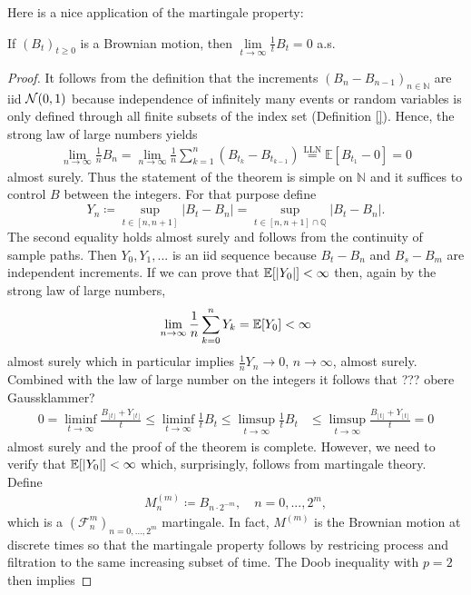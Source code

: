 Here is a nice application of the martingale property:
\begin{llemma}
\begin{prop}
	If $(B_t)_{t\geq 0}$ is a Brownian motion, then $\lim\limits_{t\to\infty} \frac{1}{t}B_t = 0$ a.s.
\end{prop}
\end{llemma}
\begin{proof}[Proof]
	It follows from the definition that the increments
	$(B_n-B_{n-1})_{n\in\mathbb{N}}$ are iid $\mathcal{N}(0,1)$ because independence of infinitely many events or random variables is only defined through all finite subsets of the index set (Definition \ref{}). Hence, the strong law of large numbers yields
	\begin{align*}
		\lim_{n\to\infty} \frac{1}{n} B_n = \lim_{n\to\infty} \frac{1}{n}\sum_{k=1}^n (B_{t_k}-B_{t_{k-1}})  \overset{\text{LLN}}{=} \mathds E[B_{t_1}-0] = 0
	\end{align*}
	almost surely. Thus the statement of the theorem is simple on $\mathbb{N}$ and it suffices to control $B$ between the integers. For that purpose define $$Y_n \coloneqq \sup_{t\in[n,n+1]} \lvert B_t - B_n \rvert = \sup_{t\in[n,n+1]\cap \mathbb{Q}} \lvert B_t - B_n \rvert.$$ The second equality holds almost surely and follows from the continuity of sample paths.
	Then $Y_0,Y_1,...$ is an iid sequence because $B_t- B_n$ and $B_s - B_m$ are independent increments. If we can prove that $\mathbb{E} [\lvert Y_0 \rvert]< \infty$ then, again by the strong law of large numbers, $$\lim\limits_{n\to\infty} \frac{1}{n}\sum\limits_{k=0}^n Y_k = \mathbb{E}[Y_0] < \infty$$ almost surely which in particular implies $\frac{1}{n}Y_n \rightarrow 0$, $n\to\infty$, almost surely. Combined with the law of large number on the integers it follows that ??? obere Gaussklammer?
	\begin{align*}
		0=\liminf_{t\to\infty}\frac{B_{\lfloor t \rfloor}+Y_{\lfloor t \rfloor}}{t}\leq\liminf_{t\to\infty}\frac{1}{t}B_t\leq \limsup_{t\to\infty}\frac{1}{t}B_t &\leq \limsup_{t\to\infty}\frac{B_{\lfloor t \rfloor}+Y_{\lfloor t \rfloor}}{t} = 0
	\end{align*}
	almost surely and the proof of the theorem is complete. However, we need to verify that $\mathbb{E}[\lvert Y_0 \rvert ]< \infty$ which, surprisingly, follows from martingale theory. Define
	\begin{align*}
		M_n^{(m)} \coloneqq B_{n\cdot 2^{-m}}, \quad n=0,...,2^m,
	\end{align*}
	which is a $(\mathcal F^{m}_n)_{n=0,...,2^m}$ martingale. In fact, $M^{(m)}$ is the Brownian motion at discrete times so that the martingale property follows by restricing process and filtration to the same increasing subset of time. The Doob inequality with $p=2$ then implies

\end{proof}
